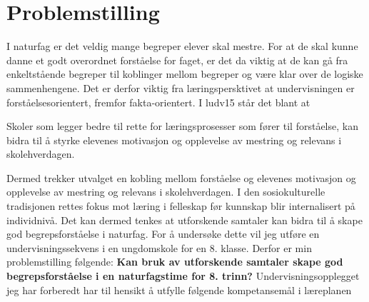 \documentclass[main.tex]{subfiles}
\begin{document}
\section*{Problemstilling}

I naturfag er det veldig mange begreper elever skal mestre. For at de skal kunne danne et godt 
overordnet forståelse for faget, er det da viktig at de kan gå fra enkeltstående begreper til 
koblinger mellom begreper og være klar over de logiske sammenhengene. Det er derfor viktig fra 
læringspersktivet at undervisningen er forståelsesorientert, fremfor fakta-orientert. I \citeA
{ludv15} står det blant at
\begin{displayquote}
\guillemotleft Skoler som legger bedre til rette for læringsprosesser som fører til forståelse, kan bidra til å 
styrke elevenes motivasjon og opplevelse av mestring og relevans i skolehverdagen.\guillemotright 
\end{displayquote}
Dermed trekker utvalget en kobling mellom forståelse og elevenes motivasjon og opplevelse av
mestring og relevans i skolehverdagen. I den sosiokulturelle tradisjonen rettes fokus mot læring i 
felleskap før kunnskap blir internalisert på individnivå. Det kan dermed tenkes at utforskende 
samtaler kan bidra til å skape god begrepsforståelse i naturfag. For å undersøke dette vil jeg
utføre en undervisningssekvens i en ungdomskole for en 8. klasse.
\newline
\newline
Derfor er min problemstilling følgende:
\newline
\newline
\textbf{Kan bruk av utforskende samtaler skape god begrepsforståelse i en naturfagstime 
for 8. trinn?}
\newline
\newline
Undervisningsopplegget jeg har forberedt har til hensikt å utfylle følgende kompetansemål i 
læreplanen
\end{document}
